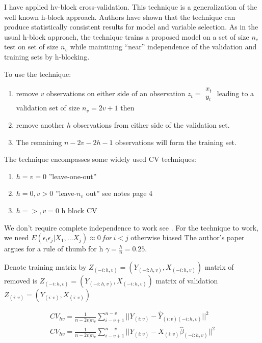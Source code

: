 \documentclass[12pt]{article}
\newcommand{\iv}{{(i:v)}}
\newcommand{\pihv}{{(-i:h,v)}}
\newcommand{\mihv}{{(-i:h,v)}}
\begin{document}
I have applied hv-block cross-validation\cite{racine00:_consis}.
This technique is a generalization of the well known 
h-block approach. Authors have shown that
the technique can produce statistically consistent results for model and 
variable selection.
As in the usual h-block approach, the 
technique trains a proposed model on a set of 
size $n_c$ test on set of size $n_v$ while 
 maintining ``near'' independence of the 
validation and training sets by h-blocking.



To use the technique:

 \begin{enumerate}
 \item remove $v$ observations on either side of an observation $z_t=\begin{matrix}x_t\\y_t\end{matrix}$ leading to a validation set of size $n_v=2v+1$  then
 \item remove another $h$ observations from either side of the validation set. 
 \item The remaining $n-2v-2h-1$ observations will form the training set.  
 \end{enumerate}

The technique encompasses some widely used CV techniques: 
\begin{enumerate}
\item $h=v=0$ ''leave-one-out''
\item $h=0, v>0$ ''leave-$n_v$ out'' see notes page 4
\item $h=>, v=0$ h block CV
\end{enumerate}


We don't require complete independence to work see \cite{burman94}.
For the technique to work, we need 
$E(\epsilon_t\epsilon_j|X_1, \ldots X_j)\approx0 \, for \, i<j$ otherwise biased
The author's paper argues for 
a rule of thumb for h $\gamma= \frac{h}{n} =0.25$.


Denote training matrix by $Z_\mihv=(Y_\mihv,X_\mihv)$ matrix of removed  is $Z_\pihv=(Y_\pihv,X_\pihv)$ matrix of validation  $Z_\iv=(Y_\iv,X_\iv)$


  \begin{gather}
    CV_{hv}=\frac{1}{n-2v)n_v}\sum_{i-v+1}^{n-v} || Y_\iv-\hat{Y}_{\iv\mihv}||^2\\
    CV_{hv}=\frac{1}{n-2v)n_v}\sum_{i-v+1}^{n-v} || Y_\iv-X_\iv\hat{\beta}_\mihv||^2
  \end{gather}
\end{document}
